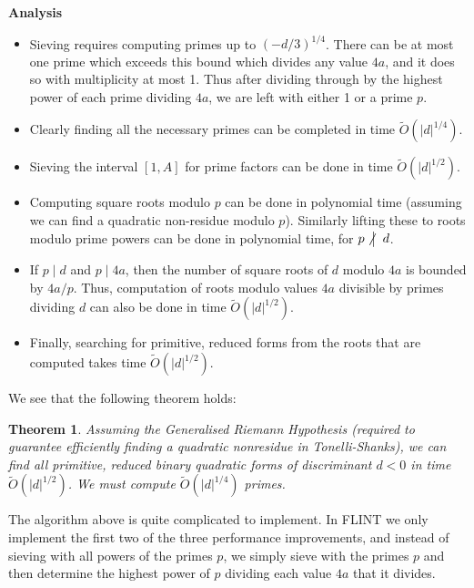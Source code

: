 \documentclass[a4paper,10pt]{amsart}
\def\notdivides{\mathrel{\kern-3pt\not\!\kern4.5pt\bigm|}}
\newtheorem{theorem}{Theorem}[section]
\begin{document}
\textbf{Analysis}

\begin{itemize}
\item Sieving requires computing primes up to $(-d/3)^{1/4}$. There can be at most one prime which exceeds this bound which divides any value $4a$, and it does so with multiplicity at most 1. Thus after dividing through by the highest power of each prime dividing $4a$, we are left with either 1 or a prime $p$. 

\item Clearly finding all the necessary primes can be completed in time $\tilde{O}(|d|^{1/4})$.

\item Sieving the interval $[1, A]$ for prime factors can be done in time $\tilde{O}(|d|^{1/2})$. 

\item Computing square roots modulo $p$ can be done in polynomial time (assuming we can find a quadratic non-residue modulo $p$). Similarly lifting these to roots modulo prime powers can be done in polynomial time, for $p \;\notdivides\; d$. 

\item If $p \;|\; d$ and $p \;|\; 4a$, then the number of square roots of $d$ modulo $4a$ is bounded by $4a/p$. Thus, computation of roots modulo values $4a$ divisible by primes dividing $d$ can also be done in time $\tilde{O}(|d|^{1/2})$.

\item Finally, searching for primitive, reduced forms from the roots that are computed takes time $\tilde{O}(|d|^{1/2})$.
\end{itemize}

We see that the following theorem holds:

\begin{theorem}Assuming the Generalised Riemann Hypothesis (required to guarantee efficiently finding a quadratic nonresidue in Tonelli-Shanks), we can find all primitive, reduced binary quadratic forms of discriminant $d < 0$ in time $\tilde{O}(|d|^{1/2})$. We must compute $\tilde{O}(|d|^{1/4})$ primes.
\end{theorem}

The algorithm above is quite complicated to implement. In FLINT we only implement the first two of the three performance improvements, and instead of sieving with all powers of the primes $p$, we simply sieve with the primes $p$ and then determine the highest power of $p$ dividing each value $4a$ that it divides.
\end{document}

